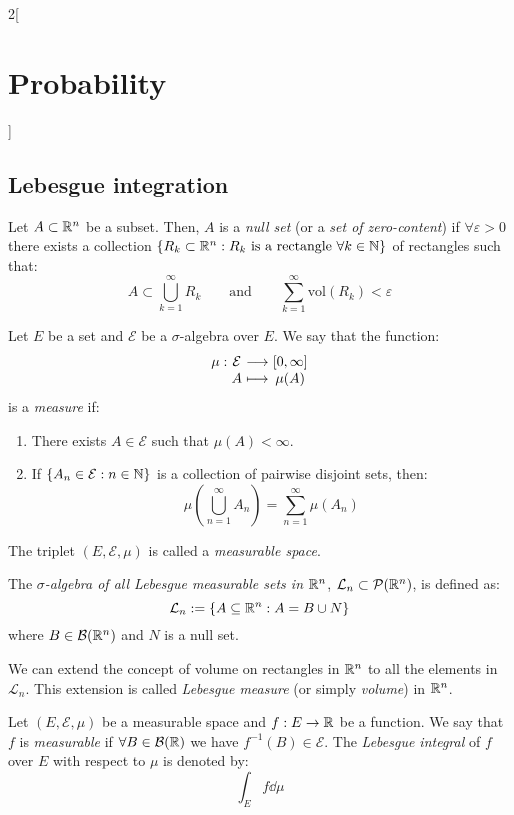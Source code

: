 \documentclass[../../../main_math.tex]{subfiles}
\begin{document}
\begin{multicols}{2}[\section{Probability}]
  \subsection{Lebesgue integration}
  \begin{definition}
    Let $A\subset\mathbb{R}^n$ be a subset. Then, $A$ is a \emph{null set} (or a \emph{set of zero-content}) if $\forall \varepsilon>0$ there exists a collection $\{R_k\subset\mathbb{R}^n:R_k\text{ is a rectangle }\forall k\in\mathbb{N}\}$ of rectangles such that:
    $$A\subset\bigcup_{k=1}^\infty R_k\qquad\text{and}\qquad\sum_{k=1}^\infty\text{vol}(R_k)<\varepsilon$$
  \end{definition}
  \begin{definition}
    Let $E$ be a set and $\mathcal{E}$ be a $\sigma$-algebra over $E$. We say that the function:
    $$
      \function{\mu}{\mathcal{E}}{[0,\infty]}{A}{\mu(A)}
    $$
    is a \emph{measure} if:
    \begin{enumerate}
      \item There exists $A\in\mathcal{E}$ such that $\mu(A)<\infty$.
      \item If $\{A_n\in\mathcal{E}:n\in\mathbb{N}\}$ is a collection of pairwise disjoint sets, then: $$\mu\left(\bigcup_{n=1}^\infty A_n\right)=\sum_{n=1}^\infty \mu(A_n)$$
    \end{enumerate}
    The triplet $(E,\mathcal{E},\mu)$ is called a \emph{measurable space}.
  \end{definition}
  \begin{definition}
    The \emph{$\sigma$-algebra of all Lebesgue measurable sets in $\mathbb{R}^n$}, $\mathcal{L}_n\subset\mathcal{P}(\mathbb{R}^n)$, is defined as:
    \begin{equation*}
      \mathcal{L}_n:=\{A\subseteq\mathbb{R}^n:A=B\cup N\}
    \end{equation*}
    where $B\in\mathcal{B}(\mathbb{R}^n)$ and $N$ is a null set.
  \end{definition}
  \begin{theorem}
    We can extend the concept of volume on rectangles in $\mathbb{R}^n$ to all the elements in $\mathcal{L}_n$. This extension is called \emph{Lebesgue measure} (or simply \emph{volume}) in $\mathbb{R}^n$.
  \end{theorem}
  \begin{definition}
    Let $(E,\mathcal{E},\mu)$ be a measurable space and $f:E\rightarrow\mathbb{R}$ be a function. We say that $f$ is \emph{measurable} if $\forall B\in\mathcal{B}(\mathbb{R})$ we have $f^{-1}(B)\in\mathcal{E}$. The \emph{Lebesgue integral} of $f$ over $E$ with respect to $\mu$ is denoted by: $$\int_Ef\dd\mu$$

\end{definition}
\end{multicols}
\end{document}
